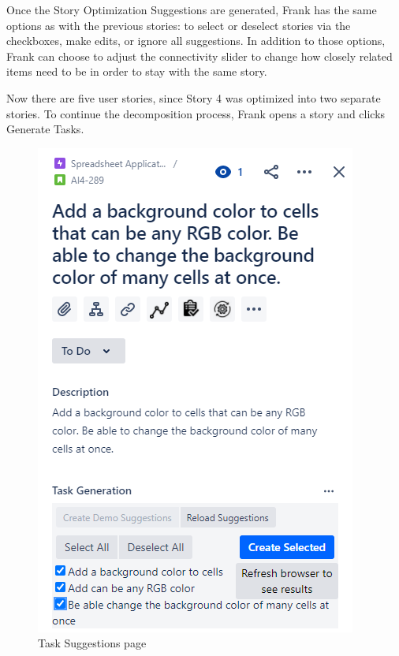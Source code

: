 Once the Story Optimization Suggestions are generated, Frank has the same options as with the previous stories: to select or deselect stories via the checkboxes, make edits, or ignore all suggestions. In addition to those options, Frank can choose to adjust the connectivity slider to change how closely related items need to be in order to stay with the same story.  

Now there are five user stories, since Story 4 was optimized into two separate stories. To continue the decomposition process, Frank opens a story and clicks Generate Tasks.

\begin{figure}
\centerline{\includegraphics[scale=0.65,width=\textwidth,height=\textheight,keepaspectratio]{./figure/Scenario1Figure4.png}}
\caption{Task Suggestions page}
\end{figure}

